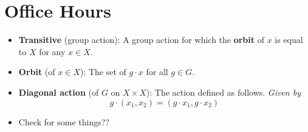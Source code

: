 \documentclass[../notes.tex]{subfiles}
\begin{document}
\section{Office Hours}
\begin{itemize}
    \item {}\textbf{Transitive} (group action): A group action for which the \textbf{orbit} of $x$ is equal to $X$ for any $x\in X$.
    \item \textbf{Orbit} (of $x\in X$): The set of $g\cdot x$ for all $g\in G$.
    \item \textbf{Diagonal action} (of $G$ on $X\times X$): The action defined as follows. \emph{Given by}
    \begin{equation*}
        g\cdot(x_1,x_2) = (g\cdot x_1,g\cdot x_2)
    \end{equation*}
    \item Check \textcite{bib:Etingof} for some things??
\end{itemize}
\end{document}
